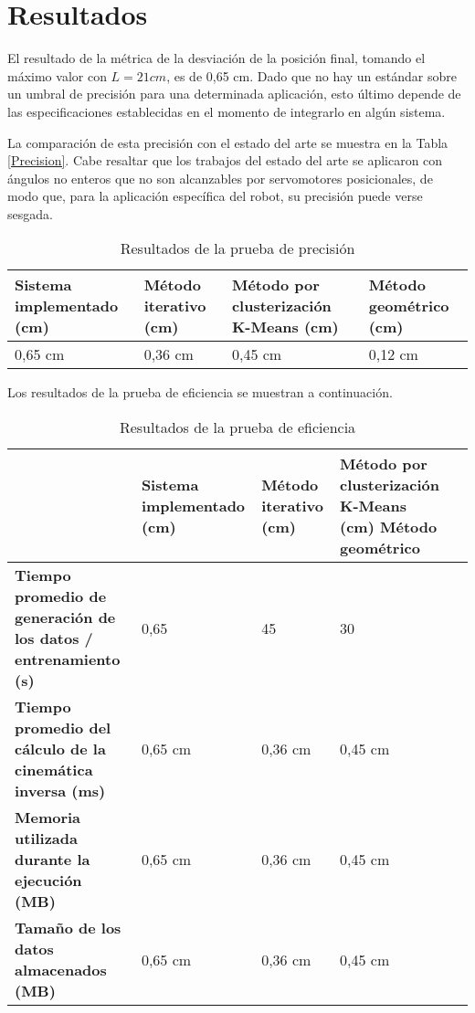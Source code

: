 \section{Resultados}

El resultado de la métrica de la desviación de la posición final, tomando el máximo valor con $L = 21 cm$, es de 0,65 cm. Dado que no hay un estándar sobre un umbral de precisión para una determinada aplicación, esto último depende de las especificaciones establecidas en el momento de integrarlo en algún sistema.

La comparación de esta precisión con el estado del arte se muestra en la Tabla \ref{Precision}. Cabe resaltar que los trabajos del estado del arte se aplicaron con ángulos no enteros que no son alcanzables por servomotores posicionales, de modo que, para la aplicación específica del robot, su precisión puede verse sesgada.

\begin{table}[ht]
	\centering
	\begin{tabular}{p{5cm}p{4cm}p{3.6cm}p{4cm}}
		\hline
		\textbf{Sistema implementado (cm)} & \textbf{Método iterativo (cm)} & \textbf{Método por clusterización K-Means (cm)} & \textbf{Método geométrico (cm)} \\
		\hline
		0,65 cm & 0,36 cm & 0,45 cm & 0,12 cm \\
		\hline
	\end{tabular}
	\caption{Resultados de la prueba de precisión}
	\label{tab:Precision}
\end{table}

Los resultados de la prueba de eficiencia se muestran a continuación.

\begin{table}[ht]
	\centering
	\begin{tabular}{p{4cm}p{5cm}p{4cm}p{3.6cm}p{4cm}}
		\hline
	    \texbf{ISO} & \textbf{Sistema implementado (cm)} & \textbf{Método iterativo (cm)} & \textbf{Método por clusterización K-Means (cm)} \textbf{Método geométrico} \\
		\hline
		\textbf{Tiempo promedio de generación de los datos / entrenamiento (s)} & 0,65 & 45 & 30 \\
		\textbf{Tiempo promedio del cálculo de la cinemática inversa (ms)} & 0,65 cm & 0,36 cm & 0,45 cm \\
		\textbf{Memoria utilizada durante la ejecución (MB)} & 0,65 cm & 0,36 cm & 0,45 cm \\
		\textbf{Tamaño de los datos almacenados (MB)} & 0,65 cm & 0,36 cm & 0,45 cm \\
		\hline
	\end{tabular}
	\caption{Resultados de la prueba de eficiencia}
	\label{tab:Precision}
\end{table}
